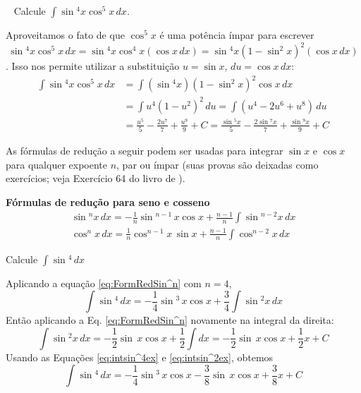 \cleardoublepage\documentclass[../main.tex]{subfiles}
\begin{document}
\begin{ex}~
 Calcule $\int \sin\!\!^4 x\cos^5 x\, dx$.

 \begin{sol}
     Aproveitamos o fato de que $\cos^5 x$ é uma potência ímpar para escrever
     $$ \sin\!\!^4 x\cos^5 x\, dx= \sin\!\!^4 x\cos^4 x(\cos x\, dx)= \sin\!\!^4 x (1-\sin^2 x)^2(\cos x\, dx)$$. 
     Isso nos permite utilizar a substituição $u=\sin x$, $du=\cos x\, dx$:
     \begin{align*}
         \int \sin\!\!^4 x\cos^5 x\, dx&=\int (\sin\!\!^4 x) (1-\sin^2 x)^2 \cos x\, dx\\
         &=\int u^4(1-u^2)^2\, du=\int (u^4-2u^6+u^8)\, du\\
         &=\frac{u^5}{5}-\frac{2u^7}{7}+\frac{u^9}{9}+C=\frac{\sin\!\!^5 x}{5}-\frac{2\sin\!\!^7 x}{7}+\frac{\sin\!\!^9 x}{9}+C
     \end{align*}
   \end{sol}
 
    
  
\end{ex}

As fórmulas de redução a seguir podem ser usadas para integrar $\sin x$ e $\cos x$ para qualquer expoente $n$, par ou ímpar (suas provas são deixadas como exercícios; veja Exercício 64 do livro de ).
\begin{framed}
\textbf{Fórmulas de redução para seno e cosseno}
\begin{align}
    \sin\!\!^n x\, dx=-\frac{1}{n}\sin\!\!^{n-1}\, x \cos x+\frac{n-1}{n}\int \sin\!\!^{n-2} x\, dx\label{eq:FormRedSin^n}\\
    \cos^n x\, dx=\frac{1}{n}\cos^{n-1} x\, \sin\!\! x+\frac{n-1}{n}\int \cos^{n-2} x\, dx\label{eq:FormRedCos^n}
\end{align}
\end{framed}
\begin{ex}
  Calcule $\int \sin\!\!^4\, dx$
  \begin{solution}
    Aplicando a equação \eqref{eq:FormRedSin^n} com $n=4$,
    \begin{equation}
        \int \sin\!\!^4\, dx=-\frac{1}{4}\sin\!\!^3\, x\cos x+\frac{3}{4}\int \sin\!\!^2 x\, dx\label{eq:intsin^4ex}
    \end{equation}
       Então aplicando a Eq. \eqref{eq:FormRedSin^n} novamente na integral da direita:
    \begin{equation}
        \int \sin\!\!^2 x\, dx=-\frac{1}{2}\sin\!\!\, x\cos x+\frac{1}{2}\int  dx=-\frac{1}{2}\sin\!\!\, x\cos x+\frac{1}{2}x+C\label{eq:intsin^2ex}
    \end{equation}
    Usando as Equações \eqref{eq:intsin^4ex} e \eqref{eq:intsin^2ex}, obtemos
    \begin{equation*}
         \int \sin\!\!^4\, dx=-\frac{1}{4}\sin\!\!^3\, x\cos x-\frac{3}{8}\sin\!\!\, x\cos x+\frac{3}{8}x+C
    \end{equation*}
  \end{solution}
\end{ex}
\end{document}
